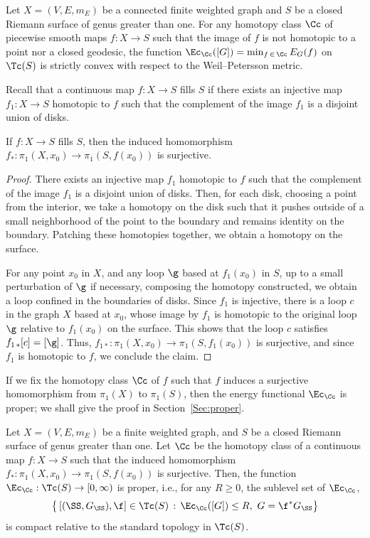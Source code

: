 \begin{theo}\label{Thm:convex}
Let $X=(V, E, m_E)$ be a connected finite weighted graph and $S$ be a closed Riemann surface of genus greater than one. For any homotopy class $\Cc$ of piecewise smooth maps $f: X \to S$ such that the image of $f$ is not homotopic to a point nor a closed geodesic, the function $\Ec_\Cc([G])=\min_{f \,\in\,\Cc}E_G(f)$ on $\Tc(S)$ is strictly convex with respect to the Weil--Petersson metric.
\end{theo}



Recall that a continuous map $f:X \to S$ fills $S$ if there exists an injective map $f_1:X \to S$ homotopic to $f$ such that the complement of the image $f_1$ is a disjoint union of disks.

\begin{lemm}\label{Lem:fill}
If $f:X \to S$ fills $S$, then the induced homomorphism $f_\ast: \pi_1(X, x_0) \to \pi_1(S, f(x_0))$ is surjective.
\end{lemm}

\begin{proof}
There exists an injective map $f_1$ homotopic to $f$ such that the complement of the image $f_1$ is a disjoint union of disks. Then, for each disk, choosing a point from the interior, we take a homotopy on the disk such that it pushes outside of a small neighborhood of the point to the boundary and remains identity on the boundary. Patching these homotopies together, we obtain a homotopy on the surface.

For any point $x_0$ in $X$, and any loop $\g$ based at $f_1(x_0)$ in $S$, up to a small perturbation of $\g$ if necessary, composing the homotopy constructed, we obtain a loop confined in the boundaries of disks. Since $f_1$ is injective, there is a loop $c$ in the graph $X$ based at $x_0$, whose image by $f_1$ is homotopic to the original loop $\g$ relative to $f_1(x_0)$ on the surface. This shows that the loop $c$ satisfies $f_{1\,\ast} [c]=[\g]$. Thus, $f_{1 \ast}: \pi_1(X, x_0) \to \pi_1(S, f_1(x_0))$ is surjective, and since $f_1$ is homotopic to $f$, we conclude the claim.
\end{proof}


If we fix the homotopy class $\Cc$ of $f$ such that $f$ induces a surjective homomorphism from $\pi_1(X)$ to $\pi_1(S)$, then the energy functional $\Ec_\Cc$ is proper; we shall give the proof in Section~\ref{Sec:proper}.

\begin{theo}\label{Thm:proper}
Let $X=(V, E, m_E)$ be a finite weighted graph, and $S$ be a closed Riemann surface of genus greater than one. Let $\Cc$ be the homotopy class of a continuous map $f:X \to S$ such that the induced homomorphism $f_\ast:\pi_1(X, x_0) \to \pi_1(S, f(x_0))$ is surjective. Then, the function $\Ec_\Cc:\Tc(S) \to [0, \infty)$ is proper, i.e., for any $R \ge 0$, the sublevel set of $\Ec_\Cc$,
\[
\big\{\left[(\SS, G_\SS), \f\right] \in \Tc(S) \, : \, \Ec_\Cc([G]) \le R, \ G=\f^\ast G_\SS \big\}
\]
is compact relative to the standard topology in $\Tc(S)$.
\end{theo}

